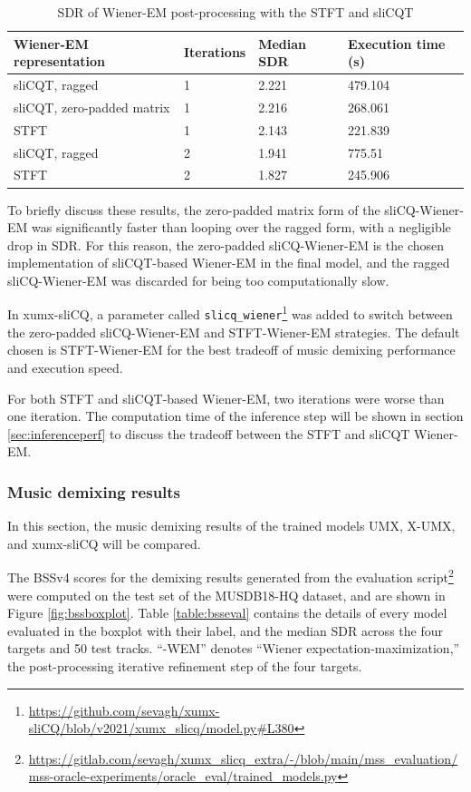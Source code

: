 \documentclass[report.tex]{subfiles}
\begin{document}
\begin{table}[ht]
	\centering
	\caption{SDR of Wiener-EM post-processing with the STFT and sliCQT}
	\label{table:wienerem}
	\begin{tabular}{ |l|l|l|l| }
	 \hline
		Wiener-EM representation & Iterations & Median SDR & Execution time (s) \\
	 \hline
	 \hline
		sliCQT, ragged & 1 & 2.221 & 479.104 \\
	 \hline
		sliCQT, zero-padded matrix & 1 & 2.216 & 268.061  \\
	 \hline
		STFT & 1 & 2.143 & 221.839  \\
	 \hline
		sliCQT, ragged & 2 & 1.941 & 775.51  \\
	 \hline
		STFT & 2 & 1.827 & 245.906  \\
	 \hline
\end{tabular}
\end{table}

To briefly discuss these results, the zero-padded matrix form of the sliCQ-Wiener-EM was significantly faster than looping over the ragged form, with a negligible drop in SDR. For this reason, the zero-padded sliCQ-Wiener-EM is the chosen implementation of sliCQT-based Wiener-EM in the final model, and the ragged sliCQ-Wiener-EM was discarded for being too computationally slow.

In xumx-sliCQ, a parameter called \Verb#slicq_wiener#\footnote{\url{https://github.com/sevagh/xumx-sliCQ/blob/v2021/xumx_slicq/model.py\#L380}} was added to switch between the zero-padded sliCQ-Wiener-EM and STFT-Wiener-EM strategies. The default chosen is STFT-Wiener-EM for the best tradeoff of music demixing performance and execution speed.

For both STFT and sliCQT-based Wiener-EM, two iterations were worse than one iteration. The computation time of the inference step will be shown in section \ref{sec:inferenceperf} to discuss the tradeoff between the STFT and sliCQT Wiener-EM.

\subsubsection{Music demixing results}
\label{sec:demixresults}

In this section, the music demixing results of the trained models UMX, X-UMX, and xumx-sliCQ will be compared.

The BSSv4 scores for the demixing results generated from the evaluation script\footnote{\url{https://gitlab.com/sevagh/xumx_slicq_extra/-/blob/main/mss_evaluation/mss-oracle-experiments/oracle_eval/trained_models.py}} were computed on the test set of the MUSDB18-HQ dataset, and are shown in Figure \ref{fig:bssboxplot}. Table \ref{table:bsseval} contains the details of every model evaluated in the boxplot with their label, and the median SDR across the four targets and 50 test tracks. ``-WEM'' denotes ``Wiener expectation-maximization,'' the post-processing iterative refinement step of the four targets.
\end{document}
